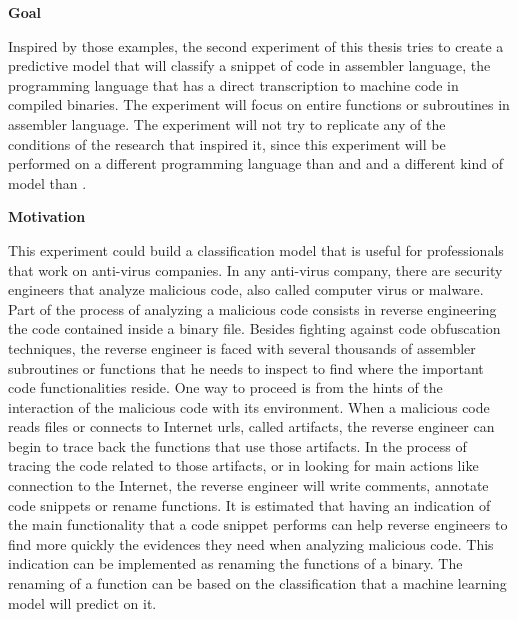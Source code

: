\textbf{Goal}

Inspired by those examples, the second experiment of this thesis tries to create a predictive model that will classify a snippet of code in assembler language, the programming language that has a direct transcription to machine code in compiled binaries. The experiment will focus on entire functions or subroutines in assembler language. The experiment will not try to replicate any of the conditions of the research that inspired it, since this experiment will be performed on a different programming language than \cite{139} and \cite{code2vec} and a different kind of model than \cite{code2vec}.

\textbf{Motivation}

This experiment could build a classification model that is useful for professionals that work on anti-virus companies. In any anti-virus company, there are security engineers that analyze malicious code, also called computer virus or malware. Part of the process of analyzing a malicious code consists in reverse engineering the code contained inside a binary file. Besides fighting against code obfuscation techniques, the reverse engineer is faced with several thousands of assembler subroutines or functions that he needs to inspect to find where the important code functionalities reside. One way to proceed is from the hints of the interaction of the malicious code with its environment. When a malicious code reads files or connects to Internet urls, called artifacts, the reverse engineer can begin to trace back the functions that use those artifacts. In the process of tracing the code related to those artifacts, or in looking for main actions like connection to the Internet, the reverse engineer will write comments, annotate code snippets or rename functions.
It is estimated that having an indication of the main functionality that a code snippet performs can help reverse engineers to find more quickly the evidences they need when analyzing malicious code. This indication can be implemented as renaming the functions of a binary. The renaming of a function can be based on the classification that a machine learning model will predict on it.




